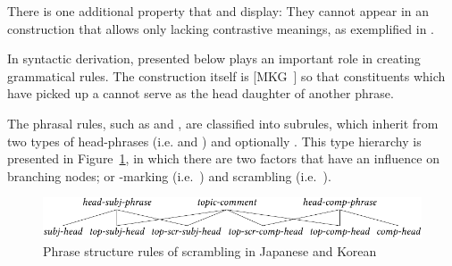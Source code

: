 \noindent There is one additional property that \wa and \nun display:
They cannot appear in an  construction that allows only
 lacking contrastive meanings, as exemplified in
.



In syntactic derivation,  presented below plays an
important role in creating grammatical rules. The
construction itself is \mbox{[MKG ]} so that constituents
which have picked up a  cannot serve as the head daughter
of another  phrase.




\noindent The phrasal rules, such as  and
, are classified into subrules, which inherit from
two types of head-phrases (i.e.  and
) and optionally . This type
hierarchy is presented in Figure~\ref{fig:top:scr}, in which there are
two factors that have an influence on branching nodes; \wa or
\onun-marking (i.e.\ ) and scrambling (i.e.\ ).


\begin{figure}[!t]
\begin{center} 
\includegraphics[width=.9\textwidth]{pdf/top-scr.pdf}
\caption{Phrase structure rules of scrambling in Japanese and Korean}
\label{fig:top:scr}
\end{center}
\end{figure}


